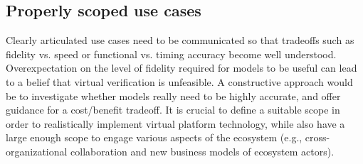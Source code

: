 

\subsection{Properly scoped use cases}
Clearly articulated use cases need to be communicated so that tradeoffs such as fidelity vs. speed or functional vs. timing accuracy become well understood.
Overexpectation on the level of fidelity required for models to be useful can lead to a belief that virtual verification is unfeasible. A constructive approach would be to investigate whether models really need to be highly accurate, and offer guidance for a cost/benefit tradeoff.
It is crucial to define a suitable scope in order to realistically implement virtual platform technology, while also have a large enough scope to engage various aspects of the ecosystem (e.g., cross-organizational collaboration and new business models of ecosystem actors). 


